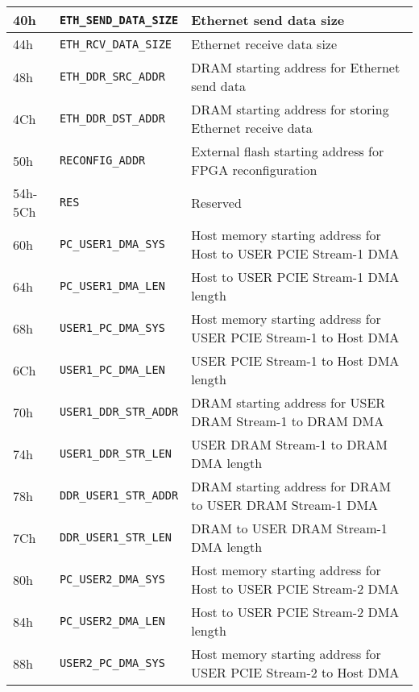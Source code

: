 \begin{longtable}{|l|l|p{9cm}|}
    40h          &  {\texttt{ETH\_SEND\_DATA\_SIZE}}           &  Ethernet send data size\\\hline
    44h          &  {\texttt{ETH\_RCV\_DATA\_SIZE }}           &  Ethernet receive data size\\\hline
    48h          &  {\texttt{ETH\_DDR\_SRC\_ADDR  }}           &  DRAM starting address for Ethernet send data\\\hline
    4Ch          &  {\texttt{ETH\_DDR\_DST\_ADDR  }}           &  DRAM starting address for storing Ethernet receive data\\\hline
    50h          &  {\texttt{RECONFIG\_ADDR       }}           &  External flash starting address for FPGA reconfiguration\\\hline
    54h-5Ch      &  {\texttt{RES                  }}           &  Reserved\\\hline
    60h          &  {\texttt{PC\_USER1\_DMA\_SYS  }}           &  Host memory starting address for Host to USER PCIE Stream-1 DMA    \\\hline
    64h          &  {\texttt{PC\_USER1\_DMA\_LEN  }}           &  Host to USER PCIE Stream-1 DMA length \\\hline
    68h          &  {\texttt{USER1\_PC\_DMA\_SYS  }}           &  Host memory starting address for USER PCIE Stream-1 to Host DMA    \\\hline
    6Ch          &  {\texttt{USER1\_PC\_DMA\_LEN  }}           &  USER PCIE Stream-1 to Host DMA length    \\\hline
    70h          &  {\texttt{USER1\_DDR\_STR\_ADDR}}           &  DRAM starting address for USER DRAM Stream-1 to DRAM DMA     \\\hline
    74h          &  {\texttt{USER1\_DDR\_STR\_LEN }}           &  USER DRAM Stream-1 to DRAM DMA length    \\\hline
    78h          &  {\texttt{DDR\_USER1\_STR\_ADDR}}           &  DRAM starting address for DRAM to USER DRAM Stream-1 DMA    \\\hline
    7Ch          &  {\texttt{DDR\_USER1\_STR\_LEN }}           &  DRAM to USER DRAM Stream-1 DMA length    \\\hline
    80h          &  {\texttt{PC\_USER2\_DMA\_SYS  }}           &  Host memory starting address for Host to USER PCIE Stream-2 DMA    \\\hline    
    84h          &  {\texttt{PC\_USER2\_DMA\_LEN  }}           &  Host to USER PCIE Stream-2 DMA length \\\hline    
    88h          &  {\texttt{USER2\_PC\_DMA\_SYS  }}           &  Host memory starting address for USER PCIE Stream-2 to Host DMA    \\\hline    

\end{longtable}
